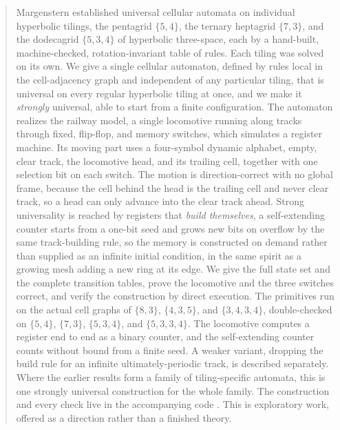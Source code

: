 \begin{abstract}
Margenstern established universal cellular automata on individual hyperbolic tilings, the pentagrid $\{5,4\}$,
the ternary heptagrid $\{7,3\}$, and the dodecagrid $\{5,3,4\}$ of hyperbolic three-space, each by a hand-built,
machine-checked, rotation-invariant table of rules. Each tiling was solved on its own. We give a single
cellular automaton, defined by rules local in the cell-adjacency graph and independent of any particular
tiling, that is universal on every regular hyperbolic tiling at once, and we make it \textit{strongly} universal, able
to start from a finite configuration. The automaton realizes the railway model, a single locomotive running
along tracks through fixed, flip-flop, and memory switches, which simulates a register machine. Its moving part
uses a four-symbol dynamic alphabet, empty, clear track, the locomotive head, and its trailing cell, together
with one selection bit on each switch. The motion is direction-correct with no global frame, because the cell
behind the head is the trailing cell and never clear track, so a head can only advance into the clear track
ahead. Strong universality is reached by registers that \textit{build themselves}, a self-extending counter starts from
a one-bit seed and grows new bits on overflow by the same track-building rule, so the memory is constructed on
demand rather than supplied as an infinite initial condition, in the same spirit as a growing mesh adding a new
ring at its edge. We give the full state set and the complete transition tables, prove the locomotive and the
three switches correct, and verify the construction by direct execution. The primitives run on the actual cell
graphs of $\{8,3\}$, $\{4,3,5\}$, and $\{3,4,3,4\}$, double-checked on $\{5,4\}$, $\{7,3\}$, $\{5,3,4\}$, and
$\{5,3,3,4\}$. The locomotive computes a register end to end as a binary counter, and the self-extending
counter counts without bound from a finite seed. A weaker variant, dropping the build rule for an infinite
ultimately-periodic track, is described separately. Where the earlier results form a family of tiling-specific
automata, this is one strongly universal construction for the whole family. The construction and every check
live in the accompanying code \cite{pollard2026vibe}. This is exploratory work, offered as a direction rather
than a finished theory.
\end{abstract}
